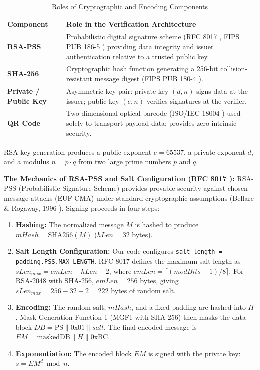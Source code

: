 \documentclass[10pt,a4paper]{article}
\begin{document}
\begin{table}[!htbp]
\centering
\caption{Roles of Cryptographic and Encoding Components}
\label{tab:components}
\small
\begin{tabularx}{\textwidth}{>{\raggedright\arraybackslash}p{2.8cm} >{\raggedright\arraybackslash}X}
\toprule
\textbf{Component} & \textbf{Role in the Verification Architecture} \\
\midrule
\textbf{RSA-PSS} & Probabilistic digital signature scheme (RFC 8017 \cite{rfc8017}, FIPS PUB 186-5 \cite{fips186_5}) providing data integrity and issuer authentication relative to a trusted public key. \\
\textbf{SHA-256} & Cryptographic hash function generating a 256-bit collision-resistant message digest (FIPS PUB 180-4 \cite{fips180_4}). \\
\textbf{Private / Public Key} & Asymmetric key pair: private key $(d, n)$ signs data at the issuer; public key $(e, n)$ verifies signatures at the verifier. \\
\textbf{QR Code} & Two-dimensional optical barcode (ISO/IEC 18004 \cite{iso18004}) used solely to transport payload data; provides zero intrinsic security. \\
\bottomrule
\end{tabularx}
\end{table}

RSA key generation produces a public exponent $e = 65537$, a private exponent $d$, and a modulus $n = p \cdot q$ from two large prime numbers $p$ and $q$.

\noindent \textbf{The Mechanics of RSA-PSS and Salt Configuration (RFC 8017 \cite{rfc8017}):}
RSA-PSS (Probabilistic Signature Scheme) provides provable security against chosen-message attacks (EUF-CMA) under standard cryptographic assumptions (Bellare \& Rogaway, 1996 \cite{bellare1996}). Signing proceeds in four steps:
\begin{enumerate}
    \setlength{\itemsep}{0pt}
    \setlength{\parskip}{0pt}
    \item \textbf{Hashing:} The normalized message $M$ is hashed to produce $mHash = \text{SHA256}(M)$ ($hLen = 32$ bytes).
    \item \textbf{Salt Length Configuration:} Our code configures \texttt{salt\_length =} \allowbreak \texttt{padding.PSS.MAX\_LENGTH}. RFC 8017 \cite{rfc8017} defines the maximum salt length as $sLen_{max} = emLen - hLen - 2$, where $emLen = \lceil (modBits - 1)/8 \rceil$. For RSA-2048 with SHA-256, $emLen = 256$ bytes, giving $sLen_{max} = 256 - 32 - 2 = 222$ bytes of random salt.
    \item \textbf{Encoding:} The random salt, $mHash$, and a fixed padding are hashed into $H$. Mask Generation Function 1 (MGF1 with SHA-256) then masks the data block $DB = \text{PS} \parallel \text{0x01} \parallel salt$. The final encoded message is $EM = \text{maskedDB} \parallel H \parallel \text{0xBC}$.
    \item \textbf{Exponentiation:} The encoded block $EM$ is signed with the private key: $s = EM^d \bmod n$.
\end{enumerate}
\end{document}

